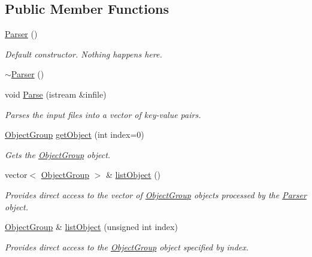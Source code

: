 \subsection*{Public Member Functions}
\begin{DoxyCompactItemize}
\item 
\hypertarget{class_parser_a12234f6cd36b61af4b50c94a179422c1}{\hyperlink{class_parser_a12234f6cd36b61af4b50c94a179422c1}{Parser} ()}\label{class_parser_a12234f6cd36b61af4b50c94a179422c1}

\begin{DoxyCompactList}\small\item\em Default constructor. Nothing happens here. \end{DoxyCompactList}\item 
\hyperlink{class_parser_a3e658b5917a93a3ef648050d060e3a93}{$\sim$\-Parser} ()
\item 
void \hyperlink{class_parser_a421d4bb43316ea2cb50b1caf0eec5a85}{Parse} (istream \&infile)
\begin{DoxyCompactList}\small\item\em Parses the input files into a vector of key-\/value pairs. \end{DoxyCompactList}\item 
\hyperlink{class_object_group}{Object\-Group} \hyperlink{class_parser_ab8e77da06e72ede97238d28bad4a9ae6}{get\-Object} (int index=0)
\begin{DoxyCompactList}\small\item\em Gets the \hyperlink{class_object_group}{Object\-Group} object. \end{DoxyCompactList}\item 
vector$<$ \hyperlink{class_object_group}{Object\-Group} $>$ \& \hyperlink{class_parser_a93885957453b4b7e346ee1b2b79d05f8}{list\-Object} ()
\begin{DoxyCompactList}\small\item\em Provides direct access to the vector of \hyperlink{class_object_group}{Object\-Group} objects processed by the \hyperlink{class_parser}{Parser} object. \end{DoxyCompactList}\item 
\hyperlink{class_object_group}{Object\-Group} \& \hyperlink{class_parser_ac7323370460e1373acf710cbe2014c9a}{list\-Object} (unsigned int index)
\begin{DoxyCompactList}\small\item\em Provides direct access to the \hyperlink{class_object_group}{Object\-Group} object specified by index. \end{DoxyCompactList}\item 

\end{DoxyCompactItemize}
